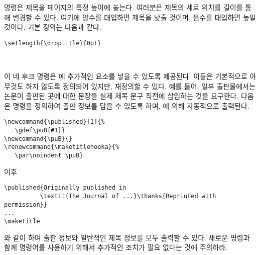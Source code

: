 \documentclass[10pt,a4paper]{oblivoir}
\newcommand{\published}[1]{%
  \gdef\puB{#1}}
\renewcommand{\maketitlehooka}{%
  \par\begin{flushright}\puB\end{flushright}}
\begin{document}
\begin{tcolorbox}
\cmd{\droptitle}
\end{tcolorbox}
\cmd{\maketitle} 명령은 제목을 페이지의 특정 높이에 놓는다.
여러분은 제목의 세로 위치를 \cmd{\droptitle} 길이를 통해 변경할 수 있다.
여기에 양수를 대입하면 제목을 낮출 것이며, 음수를 대입하면 높일 것이다.
기본 정의는 다음과 같다.
\begin{verbatim}
\setlength{\droptitle}{0pt}
\end{verbatim}

\begin{tcolorbox}
\cmd{\maketitlehooka} \cmd{\maketitlehookb}\\
\cmd{\maketitlehookc} \cmd{\maketitlehookd}
\end{tcolorbox}
이 네 후크 명령은 \cmd{\maketitle}에 추가적인 요소를 넣을 수 있도록 제공된다.
이들은 기본적으로 아무것도 하지 않도록 정의되어 있지만, 재정의할 수 있다.
예를 들어, 일부 출판물에서는 논문이 출판된 곳에 대한 문장을 실제 제목 문구
직전에 삽입하는 것을 요구한다.
다음은 \cmd{\published} 명령을 정의하여 출판 정보를 담을 수 있도록 하며,
\cmd{\maketitle}에 의해 자동적으로 출력된다.
\begin{verbatim}
\newcommand{\published}[1]{%
   \gdef\puB{#1}}
\newcommand{\puB}{}
\renewcommand{\maketitlehooka}{%
   \par\noindent \puB}
\end{verbatim}
이후
\begin{verbatim}
\published{Originally published in 
          \textit{The Journal of ...}\thanks{Reprinted with permission}}
...
\maketitle
\end{verbatim}
와 같이 하여 출판 정보와 일반적인 제목 정보를 모두 출력할 수 있다.
새로운 \cmd{\published} 명령과 함께 \cmd{\thanks} 명령어를 사용하기 위해서
추가적인 조치가 필요 없다는 것에 주의하라.
\end{document}
